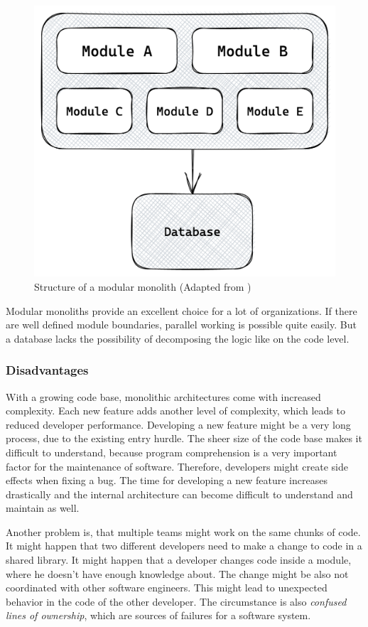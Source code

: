 \ifshowImages
\begin{figure}[H]
    \centering
    \includegraphics[width=0.4\linewidth]{images/background/monolith/modular-monolith-sketch.png}
    \caption{Structure of a modular monolith (Adapted from \cite[13]{book:2019:newman:background:monolith:monolith-to-microservices})}\label{fig:background:monolith:module-monolith-sketch}
\end{figure}
\fi

\noindent Modular monoliths provide an excellent choice for a lot of organizations. If there are well defined module boundaries, parallel working is possible quite easily. But a database lacks the possibility of decomposing the logic like on the code level. \cite[12-13]{book:2019:newman:background:monolith:monolith-to-microservices}

\subsubsection{Disadvantages}

With a growing code base, monolithic architectures come with increased complexity. Each new feature adds another level of complexity, which leads to reduced developer performance. Developing a new feature might be a very long process, due to the existing entry hurdle. The sheer size of the code base makes it difficult to understand, because program comprehension is a very important factor for the maintenance of software. \cite{article:1995:mayrhauser:background:monoliths:program-comprehension-during-software-maintenance-and-evolution} Therefore, developers might create side effects when fixing a bug. The time for developing a new feature increases drastically and the internal architecture can become difficult to understand and maintain as well. \cite[4-6]{book:2018:richardson:background:bff:microservices-patterns}

\bigskip

\noindent Another problem is, that multiple teams might work on the same chunks of code. It might happen that two different developers need to make a change to code in a shared library. It might happen that a developer changes code inside a module, where he doesn't have enough knowledge about. The change might be also not coordinated with other software engineers. This might lead to unexpected behavior in the code of the other developer. The circumstance is also \textit{confused lines of ownership}, which are sources of failures for a software system. \cite[15]{book:2019:newman:background:monolith:monolith-to-microservices} \cite[7]{inproceedings:2011:bird:background:monoliths:dont-touch-my-code}

